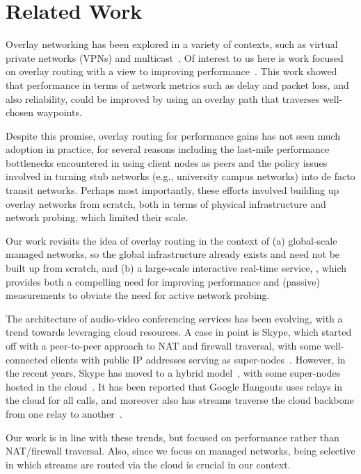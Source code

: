 \section{Related Work}
\label{sec:via:related}


Overlay networking has been explored in a variety of contexts, such as virtual private networks (VPNs) and multicast~\cite{mbone,ALMI-USITS01,Multicast-Sigcomm02}. Of interest to us here is work focused on overlay routing with a view to improving performance~\cite{Detour-Sigcomm99,RON-SOSP01}. This work showed that performance in terms of network metrics such as delay and packet loss, and also reliability, could be improved by using an overlay path that traverses well-chosen waypoints. 

Despite this promise,  overlay routing for performance gains has not seen much adoption in practice, for several reasons including the last-mile performance bottlenecks encountered in using client nodes as peers and the policy issues involved in turning stub networks (e.g., university campus networks) into de facto transit networks. Perhaps most importantly, these efforts involved building up overlay networks from scratch, both in terms of physical infrastructure and network probing, which limited their scale.

Our work revisits the idea of overlay routing in the context of (a) global-scale managed networks, so the global infrastructure already exists and need not be built up from scratch, and (b) a large-scale interactive real-time service, \skype, which provides both a compelling need for improving performance and (passive) measurements to obviate the need for active network probing.


 The architecture of audio-video conferencing services has been evolving, with a trend towards leveraging cloud resources. A case in point is Skype, which started off with a peer-to-peer approach to NAT and firewall traversal, with some well-connected clients with public IP addresses serving as super-nodes~\cite{Skype-GI08}. However, in the recent years, Skype has moved to a hybrid model~\cite{VideoTelephony-IMC12}, with some super-nodes hosted in the cloud~\cite{Skype-Zdnet13}. 
It has been reported that Google Hangouts uses relays in the cloud for all calls, and moreover also has streams traverse the cloud backbone from one relay to another~\cite{VideoTelephony-IMC12}. 

Our work is in line with these trends, but focused on performance rather than NAT/firewall traversal. Also, since we focus on managed networks, being selective in which streams are routed via the cloud is crucial in our context.

